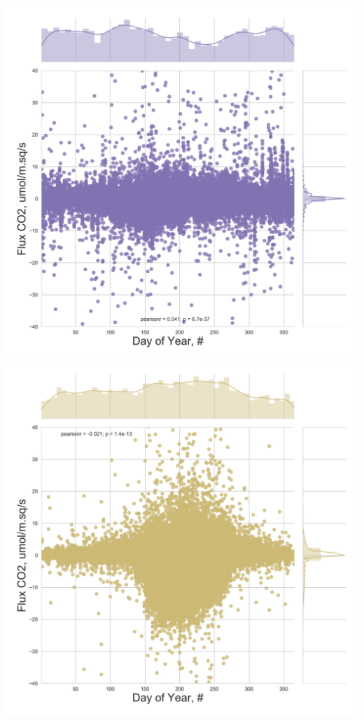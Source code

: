 \documentclass{beamer}
\begin{document}
\begin{frame}
\begin{columns}[t]
\centering
\includegraphics[width=\textwidth]{FvsY/US-FPe.png}\\
\includegraphics[width=\textwidth]{FvsY/US-Los.png}
\end{columns}

\end{frame}
\end{document}
